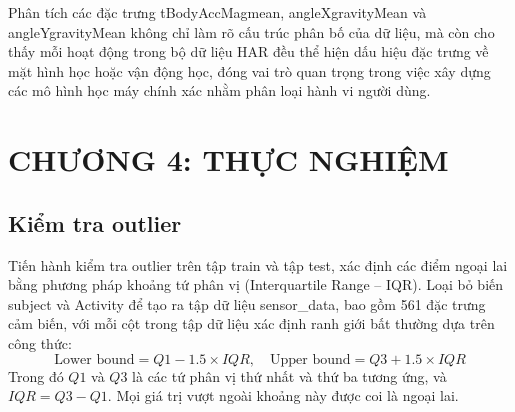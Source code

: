 \documentclass[
]{article}
\begin{document}
Phân tích các đặc trưng tBodyAccMagmean, angleXgravityMean và
angleYgravityMean không chỉ làm rõ cấu trúc phân bố của dữ liệu, mà còn
cho thấy mỗi hoạt động trong bộ dữ liệu HAR đều thể hiện dấu hiệu đặc
trưng về mặt hình học hoặc vận động học, đóng vai trò quan trọng trong
việc xây dựng các mô hình học máy chính xác nhằm phân loại hành vi người
dùng.

\section*{CHƯƠNG 4: THỰC NGHIỆM}
\setcounter{section}{4}
\setcounter{subsection}{0}

\subsection{Kiểm tra outlier}\label{kiux1ec3m-tra-outlier}

Tiến hành kiểm tra outlier trên tập train và tập test, xác định các điểm
ngoại lai bằng phương pháp khoảng tứ phân vị (Interquartile Range --
IQR). Loại bỏ biến subject và Activity để tạo ra tập dữ liệu
sensor\_data, bao gồm 561 đặc trưng cảm biến, với mỗi cột trong tập dữ
liệu xác định ranh giới bất thường dựa trên công thức: \[
\text{Lower bound} = Q1 - 1.5 \times IQR, \quad
\text{Upper bound} = Q3 + 1.5 \times IQR
\] Trong đó \emph{\(Q1\)} và \emph{\(Q3\)} là các tứ phân vị thứ nhất và
thứ ba tương ứng, và \emph{\(IQR = Q3 - Q1\)}. Mọi giá trị vượt ngoài
khoảng này được coi là ngoại lai.
\end{document}
